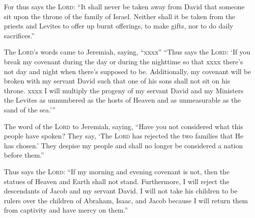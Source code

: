 \begin{inparaenum}
   For thus says the \textsc{Lord}: ``It shall never be taken away from David that someone sit upon the throne of the family of Israel.%
   Neither shall it be taken from the priests and Levites to offer up burnt offerings, to make gifts, nor to do daily sacrifices.''%
  
   The \textsc{Lord}'s words came to Jeremiah, saying, ``xxxx''%
   ``Thus says the \textsc{Lord}: `If you break my covenant during the day or during the nighttime so that xxxx there's not day and night when there's supposed to be.%
   Additionally, my covenant will be broken with my servant David such that one of his sons shall not sit on his throne. xxxx%
   I will multiply the progeny of my servant David and my Ministers the Levites as unnumbered as the hosts of Heaven and as unmeasurable as the sand of the sea.'\thinspace''%
  
   The word of the \textsc{Lord} to Jeremiah, saying,%
   ``Have you not considered what this people have spoken? They say, `The \textsc{Lord} has rejected the two families that He has chosen.' They despise my people and shall no longer be considered a nation before them.''%
  
   Thus says the \textsc{Lord}: ``If my morning and evening covenant is not, then the statues of Heaven and Earth shall not stand.%
   Furthermore, I will reject the descendants of Jacob and my servant David. I will not take his children to be rulers over the children of Abraham, Isaac, and Jacob because I will return them from captivity and have mercy on them.''%
\end{inparaenum}
